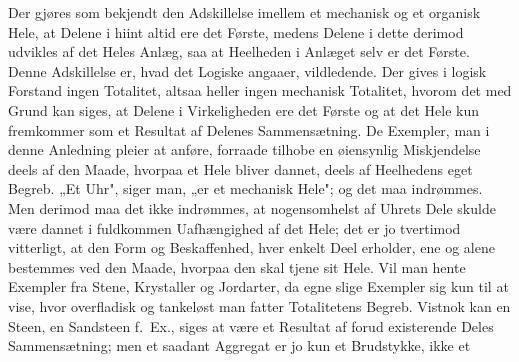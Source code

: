 \documentclass[12pt]{book}
\newcommand{\opage}[1]{\marginnote{\footnotesize\textit{[#1]}}}
\begin{document}
Der gjøres som bekjendt den Adskillelse imellem et mechanisk og et organisk Hele, at
\opage{128} Delene i hiint altid ere det Første, medens Delene i dette derimod udvikles af det Heles
Anlæg, saa at Heelheden i Anlæget selv er det Første. Denne Adskillelse er, hvad det
Logiske angaaer, vildledende. Der gives i logisk Forstand ingen Totalitet, altsaa heller
ingen mechanisk Totalitet, hvorom det med Grund kan siges, at Delene i Virkeligheden ere
det Første og at det Hele kun fremkommer som et Resultat af Delenes Sammensætning. De
Exempler, man i denne Anledning pleier at anføre, forraade tilhobe en øiensynlig
Miskjendelse deels af den Maade, hvorpaa et Hele bliver dannet, deels af Heelhedens eget
Begreb. „Et Uhr", siger man, „er et mechanisk Hele"; og det maa indrømmes. Men derimod
maa det ikke indrømmes, at nogensomhelst af Uhrets Dele skulde være dannet i fuldkommen
Uafhængighed af det Hele; det er jo tvertimod vitterligt, at den Form og Beskaffenhed,
hver enkelt Deel erholder, ene og alene bestemmes ved den Maade, hvorpaa den skal tjene
sit Hele. Vil man hente Exempler fra Stene, Krystaller og Jordarter, da egne slige
Exempler sig kun til at vise, hvor overfladisk og tankeløst man fatter Totalitetens
Begreb. Vistnok kan en Steen, en Sandsteen f.\ Ex., siges at være et Resultat af forud
existerende Deles Sammensætning; men et saadant Aggregat er jo kun et Brudstykke, ikke et
\end{document}
